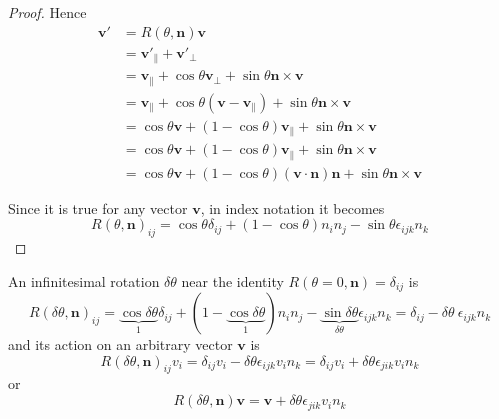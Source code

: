 \begin{proof}
        Hence
        \begin{equation*}
        \begin{aligned}
            \mathbf {v'} & = R(\theta, \mathbf n) \mathbf v \\ & = \mathbf {v'}_\parallel + \mathbf {v'}_\perp \\ & = \mathbf v_\parallel + \cos \theta \mathbf v_\perp + \sin \theta \mathbf n \times \mathbf v \\ & = \mathbf v_\parallel + \cos \theta (\mathbf v - \mathbf v_\parallel) + \sin \theta \mathbf n \times \mathbf v \\ & = \cos \theta \mathbf v + (1 - \cos \theta)\mathbf v_\parallel + \sin \theta \mathbf n \times \mathbf v \\ &  = \cos \theta \mathbf v + (1 - \cos \theta) \mathbf v_\parallel + \sin \theta \mathbf n \times \mathbf v \\ & = \cos \theta \mathbf v + (1 - \cos \theta) (\mathbf v \cdot \mathbf n) \mathbf n  + \sin \theta \mathbf n \times \mathbf v 
        \end{aligned}
        \end{equation*}
        
        Since it is true for any vector $\mathbf v$, in index notation it becomes
        \begin{equation*}
            R{(\theta, \mathbf n)}_{ij} = \cos \theta \delta_{ij} + (1 - \cos \theta) n_i n_j - \sin \theta \epsilon_{ijk} n_k
        \end{equation*}
    \end{proof}

    An infinitesimal rotation $\delta \theta$ near the identity $R(\theta = 0, \mathbf n) = \delta_{ij}$ is 
    \begin{equation*}
        R{(\delta \theta, \mathbf n)}_{ij} = \underbrace{\cos \delta \theta }_{1} \delta_{ij} + (1 - \underbrace{\cos \delta \theta }_{1}) n_i n_j - \underbrace{\sin \delta \theta}_{\delta \theta} \epsilon_{ijk} n_k = \delta_{ij} - \delta \theta ~ \epsilon_{ijk} n_k
    \end{equation*}
    and its action on an arbitrary vector $\mathbf v$ is 
    \begin{equation*}
        R{(\delta \theta, \mathbf n)}_{ij} v_i = \delta_{ij} v_i - \delta \theta \epsilon_{ijk} v_i n_k = \delta_{ij} v_i + \delta \theta \epsilon_{jik} v_i n_k 
    \end{equation*}
    or 
    \begin{equation*}
        R{(\delta \theta, \mathbf n)} \mathbf v = \mathbf v + \delta \theta \epsilon_{jik} v_i n_k 
    \end{equation*}

